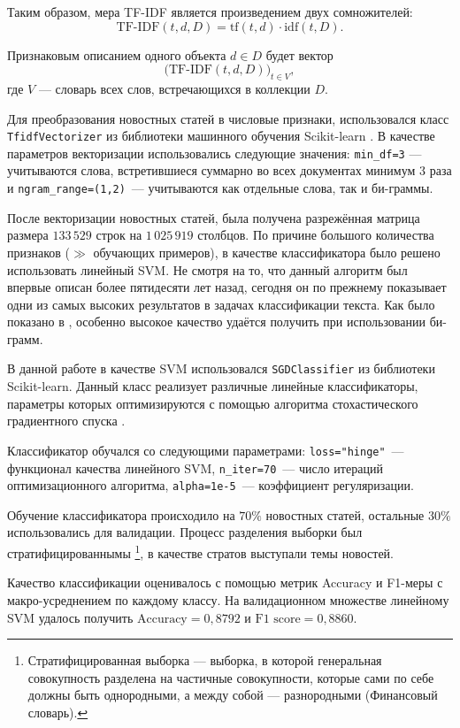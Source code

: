 \documentclass[a4paper, 14pt]{extarticle}
\begin{document}
Таким образом, мера TF-IDF является произведением двух сомножителей:
$$
\text{TF-IDF}(t, d, D) = \text{tf}(t, d) \cdot \text{idf}(t, D).
$$

Признаковым описанием одного объекта $d \in D$ будет вектор
$$
\big(\text{TF-IDF}(t,d,D)\big)_{t\in V},
$$
где $V$ --- словарь всех слов, встречающихся в коллекции $D$.

Для преобразования новостных статей в числовые признаки, использовался класс \verb+TfidfVectorizer+ из библиотеки машинного обучения Scikit-learn 
\cite{scikit-learn}. В качестве параметров векторизации использовались следующие значения: \verb+min_df=3+ --- учитываются слова, встретившиеся 
суммарно во всех документах минимум 3 раза и  \verb+ngram_range=(1,2)+~--- учитываются как отдельные слова, так и би-граммы.

После векторизации новостных статей, была получена разрежённая матрица размера $133\,529$ строк на $1\,025\,919$ столбцов. По причине большого 
количества признаков ($\gg$  обучающих примеров), в качестве классификатора было решено использовать линейный SVM. Не смотря на то, что данный 
алгоритм был впервые описан более пятидесяти лет назад, сегодня он по прежнему показывает одни из самых высоких результатов в задачах классификации 
текста. Как было показано в \cite{wang12simple}, особенно высокое качество удаётся получить при использовании би-грамм.

В данной работе в качестве SVM использовался \verb+SGDClassifier+ из библиотеки Scikit-learn. Данный класс реализует различные линейные
классификаторы, параметры которых оптимизируются с помощью алгоритма стохастического градиентного спуска \cite{Bottou2010}.

Классификатор обучался со следующими параметрами: \verb+loss="hinge"+~--- функционал качества линейного SVM,
\verb+n_iter=70+~--- число итераций оптимизационного алгоритма, \verb+alpha=1e-5+~--- коэффициент регуляризации.

Обучение классификатора происходило на $70\%$ новостных статей, остальные $30\%$ использовались для валидации.
Процесс разделения выборки был стратифицированнымы \footnote{Стратифицированная выборка --- выборка, в которой генеральная совокупность разделена на 
частичные совокупности, которые сами по себе должны быть однородными, а между собой --- разнородными (Финансовый словарь).}, в качестве
стратов выступали темы новостей.

Качество классификации оценивалось с помощью метрик Accuracy и F1-меры с макро-усреднением по каждому классу.
На валидационном множестве линейному SVM удалось получить $\text{Accuracy} = 0,8792$ и $\text{F1 score} = 0,8860$.
\end{document}
